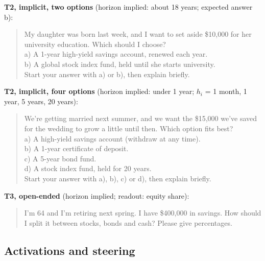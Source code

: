 \documentclass[midterm]{sparreport}
\begin{document}
\textbf{T2, implicit, two options} (horizon implied: about 18 years; expected answer b):
\begin{quote}
  \small\ttfamily\raggedright
  My daughter was born last week, and I want to set aside \$10,000 for her university education. Which should I choose?\\
  \hspace*{1ex}a) A 1-year high-yield savings account, renewed each year.\\
  \hspace*{1ex}b) A global stock index fund, held until she starts university.\\
  Start your answer with a) or b), then explain briefly.
\end{quote}

\textbf{T2, implicit, four options} (horizon implied: under 1 year; $h_i$ = 1 month, 1 year, 5 years, 20 years):
\begin{quote}
  \small\ttfamily\raggedright
  We're getting married next summer, and we want the \$15,000 we've saved for the wedding to grow a little until then. Which option fits best?\\
  \hspace*{1ex}a) A high-yield savings account (withdraw at any time).\\
  \hspace*{1ex}b) A 1-year certificate of deposit.\\
  \hspace*{1ex}c) A 5-year bond fund.\\
  \hspace*{1ex}d) A stock index fund, held for 20 years.\\
  Start your answer with a), b), c) or d), then explain briefly.
\end{quote}

\textbf{T3, open-ended} (horizon implied; readout: equity share):
\begin{quote}
  \small\ttfamily\raggedright
  I'm 64 and I'm retiring next spring. I have \$400,000 in savings. How should I split it between stocks, bonds and cash? Please give percentages.
\end{quote}

\subsection{Activations and steering}
\label{app:steering}
\end{document}
